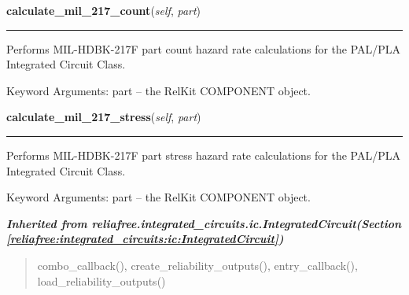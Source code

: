     \label{reliafree:integrated_circuits:palpla:PALPLA:calculate_mil_217_count}

    \vspace{0.5ex}

\hspace{.8\funcindent}\begin{boxedminipage}{\funcwidth}

    \raggedright \textbf{calculate\_mil\_217\_count}(\textit{self}, \textit{part})

    \vspace{-1.5ex}

    \rule{\textwidth}{0.5\fboxrule}
\setlength{\parskip}{2ex}
    Performs MIL-HDBK-217F part count hazard rate calculations for the 
    PAL/PLA Integrated Circuit Class.

    Keyword Arguments: part -- the RelKit COMPONENT object.

\setlength{\parskip}{1ex}
    \end{boxedminipage}

    \label{reliafree:integrated_circuits:palpla:PALPLA:calculate_mil_217_stress}

    \vspace{0.5ex}

\hspace{.8\funcindent}\begin{boxedminipage}{\funcwidth}

    \raggedright \textbf{calculate\_mil\_217\_stress}(\textit{self}, \textit{part})

    \vspace{-1.5ex}

    \rule{\textwidth}{0.5\fboxrule}
\setlength{\parskip}{2ex}
    Performs MIL-HDBK-217F part stress hazard rate calculations for the 
    PAL/PLA Integrated Circuit Class.

    Keyword Arguments: part -- the RelKit COMPONENT object.

\setlength{\parskip}{1ex}
    \end{boxedminipage}


\large{\textbf{\textit{Inherited from reliafree.integrated\_circuits.ic.IntegratedCircuit\textit{(Section \ref{reliafree:integrated_circuits:ic:IntegratedCircuit})}}}}

\begin{quote}
combo\_callback(), create\_reliability\_outputs(), entry\_callback(), load\_reliability\_outputs()
\end{quote}
